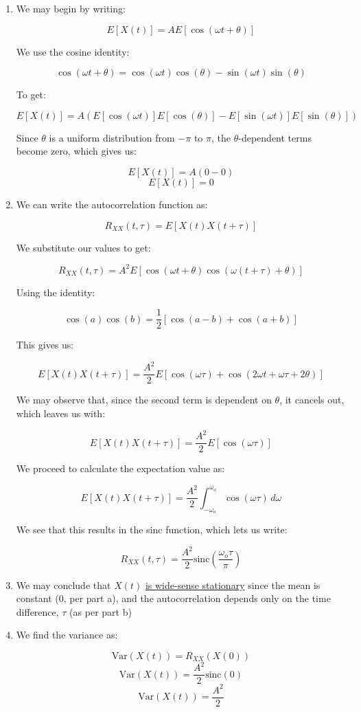 \begin{enumerate}
    \begin{enumerate}

      \item We may begin by writing:

        $$E[X(t)]=AE[\cos(\omega t+\theta)]$$

        We use the cosine identity:

        $$\cos(\omega t+\theta)=\cos(\omega t)\cos(\theta)-\sin(\omega t)\sin(\theta)$$

        To get:

        $$E[X(t)]=A\left( E[\cos(\omega t)]E[\cos(\theta)]-E[\sin(\omega t)]E[\sin(\theta)] \right)$$

        Since $\theta$ is a uniform distribution from $-\pi$ to $\pi$, the $\theta$-dependent terms become zero, which gives us:

        $$E[X(t)]=A(0-0)$$
        $$\boxed{E[X(t)]=0}$$

      \item We can write the autocorrelation function as:

        $$R_{XX}(t,\tau)=E[X(t)X(t+\tau)]$$

        We substitute our values to get:

        $$R_{XX}(t,\tau)=A^2E[\cos(\omega t+\theta)\cos(\omega(t+\tau)+\theta)]$$

        Using the identity:

        $$\cos(a)\cos(b)=\frac{1}{2}\left[ \cos(a-b)+\cos(a+b) \right]$$

        This gives us:

        $$E[X(t)X(t+\tau)]=\frac{A^2}{2}E\left[ \cos(\omega \tau)+\cos(2\omega t+\omega\tau+2\theta) \right]$$

        We may observe that, since the second term is dependent on $\theta$, it cancels out, which leaves us with:

        $$E[X(t)X(t+\tau)]=\frac{A^2}{2}E\left[ \cos(\omega \tau)\right]$$

        We proceed to calculate the expectation value as:

        $$E[X(t)X(t+\tau)]=\frac{A^2}{2}\int_{-\omega_o}^{\omega_o}\cos(\omega\tau)\,d\omega$$

        We see that this results in the sinc function, which lets us write:

        $$\boxed{R_{XX}(t,\tau)=\frac{A^2}{2}\text{sinc}\left( \frac{\omega_o\tau}{\pi} \right)}$$

      \item We may conclude that $X(t)$ \underline{is wide-sense stationary} since the mean is constant (0, per part a), and the autocorrelation depends only on the time difference, $\tau$ (as per part b)

      \item We find the variance as:

        $$\text{Var}(X(t))=R_{XX}(X(0))$$
        $$\text{Var}(X(t))=\frac{A^2}{2} \text{sinc}(0)$$
        $$\boxed{\text{Var}(X(t))=\frac{A^2}{2}}$$

    \end{enumerate}

\end{enumerate}



